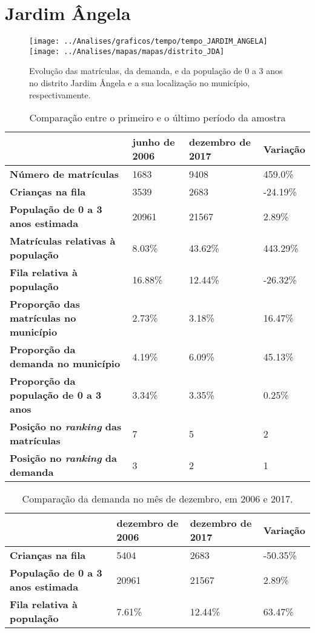 \section{Jardim Ângela}
\begin{figure}[H]
\centering
\texttt{[image: ../Analises/graficos/tempo/tempo\_JARDIM\_ANGELA]}
\texttt{[image: ../Analises/mapas/mapas/distrito\_JDA]}
\caption{Evolução das matrículas, da demanda, e da população de 0 a 3 anos no distrito Jardim Ângela e a sua localização no município, respectivamente.}
\end{figure}
\begin{table}[H]
\begin{tabular}{l|l|l|l}
\textbf{}                                      & \textbf{junho de 2006}       & \textbf{dezembro de 2017}    & \textbf{Variação} \\ \hline
\textbf{Número de matrículas}                  & 1683 & 9408 & 459.0\% \\ \hline
\textbf{Crianças na fila}                      & 3539 & 2683 & -24.19\% \\ \hline
\textbf{População de 0 a 3 anos estimada}      & 20961 & 21567 & 2.89\% \\ \hline
\textbf{Matrículas relativas à população}      & 8.03\% & 43.62\% & 443.29\% \\ \hline
\textbf{Fila relativa à população}             & 16.88\% & 12.44\% & -26.32\% \\ \hline
\textbf{Proporção das matrículas no município} & 2.73\% & 3.18\% & 16.47\% \\ \hline
\textbf{Proporção da demanda no município}     & 4.19\% & 6.09\% & 45.13\% \\ \hline
\textbf{Proporção da população de 0 a 3 anos}  & 3.34\% & 3.35\% & 0.25\% \\ \hline
\textbf{Posição no \textit{ranking} das matrículas}     & 7 & 5 & 2 \\ \hline
\textbf{Posição no \textit{ranking} da demanda}         & 3 & 2 & 1 \\ 
\end{tabular}
\caption{Comparação entre o primeiro e o último período da amostra}
\end{table}
\begin{table}[H]
\begin{tabular}{l|l|l|l}
\textbf{}                                 & \textbf{dezembro de 2006} & \textbf{dezembro de 2017} & \textbf{Variação} \\ \hline
\textbf{Crianças na fila}                      & 5404 & 2683 & -50.35\% \\ \hline
\textbf{População de 0 a 3 anos estimada}      & 20961 & 21567 & 2.89\% \\ \hline
\textbf{Fila relativa à população}             & 7.61\% & 12.44\% & 63.47\% \\
\end{tabular}
\caption{Comparação da demanda no mês de dezembro, em 2006 e 2017.}
\end{table}
